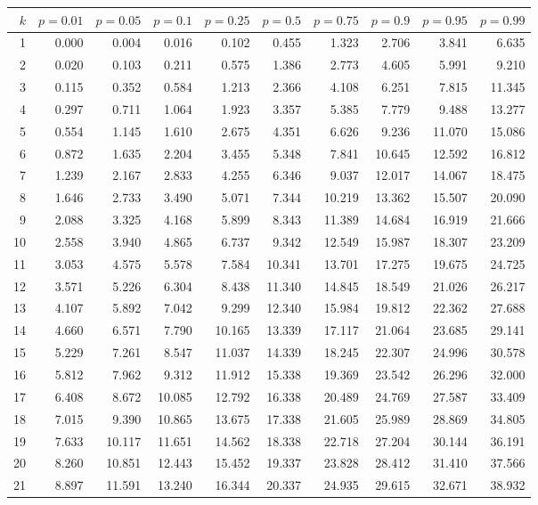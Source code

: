 \begin{center}
    \small
    \begin{tabular}{|r|rrr|rrr|rrr|}
        \hline
        \strut$k$&$p=0.01$&$p=0.05$&$p=0.1$&$p=0.25$&$p=0.5$&$p=0.75$&$p=0.9$&$p=0.95$&$p=0.99$\\
        \hline
        1&0.000&0.004&0.016&0.102&0.455&1.323&2.706&3.841&6.635\\
        2&0.020&0.103&0.211&0.575&1.386&2.773&4.605&5.991&9.210\\
        3&0.115&0.352&0.584&1.213&2.366&4.108&6.251&7.815&11.345\\
        4&0.297&0.711&1.064&1.923&3.357&5.385&7.779&9.488&13.277\\
        5&0.554&1.145&1.610&2.675&4.351&6.626&9.236&11.070&15.086\\
        6&0.872&1.635&2.204&3.455&5.348&7.841&10.645&12.592&16.812\\
        7&1.239&2.167&2.833&4.255&6.346&9.037&12.017&14.067&18.475\\
        8&1.646&2.733&3.490&5.071&7.344&10.219&13.362&15.507&20.090\\
        9&2.088&3.325&4.168&5.899&8.343&11.389&14.684&16.919&21.666\\
        10&2.558&3.940&4.865&6.737&9.342&12.549&15.987&18.307&23.209\\
        11&3.053&4.575&5.578&7.584&10.341&13.701&17.275&19.675&24.725\\
        12&3.571&5.226&6.304&8.438&11.340&14.845&18.549&21.026&26.217\\
        13&4.107&5.892&7.042&9.299&12.340&15.984&19.812&22.362&27.688\\
        14&4.660&6.571&7.790&10.165&13.339&17.117&21.064&23.685&29.141\\
        15&5.229&7.261&8.547&11.037&14.339&18.245&22.307&24.996&30.578\\
        16&5.812&7.962&9.312&11.912&15.338&19.369&23.542&26.296&32.000\\
        17&6.408&8.672&10.085&12.792&16.338&20.489&24.769&27.587&33.409\\
        18&7.015&9.390&10.865&13.675&17.338&21.605&25.989&28.869&34.805\\
        19&7.633&10.117&11.651&14.562&18.338&22.718&27.204&30.144&36.191\\
        20&8.260&10.851&12.443&15.452&19.337&23.828&28.412&31.410&37.566\\
        21&8.897&11.591&13.240&16.344&20.337&24.935&29.615&32.671&38.932\\

\end{tabular}
\end{center}
